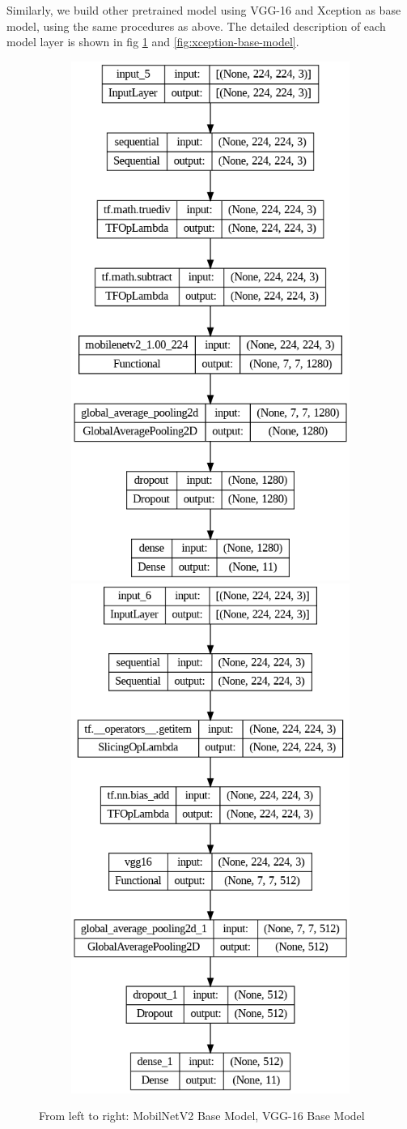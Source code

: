 Similarly, we build other pretrained model using VGG-16 and Xception as base model, using the same procedures as above. The detailed description of each model layer is shown in fig \ref{fig:mob-vgg16-base-model} and \ref{fig:xception-base-model}.

\begin{figure}
     \begin{subfigure}{\linewidth}
        \includegraphics[width=.5\linewidth]{graphics/chapter5/mobilnetV2 based model graph.png}\hfill
        \includegraphics[width=.5\linewidth]{graphics//chapter5/vgg16 base model graph.png}\hfill
    \end{subfigure}    
    \caption{From left to right: MobilNetV2 Base Model, VGG-16 Base Model}
        \label{fig:mob-vgg16-base-model}    
\end{figure}

